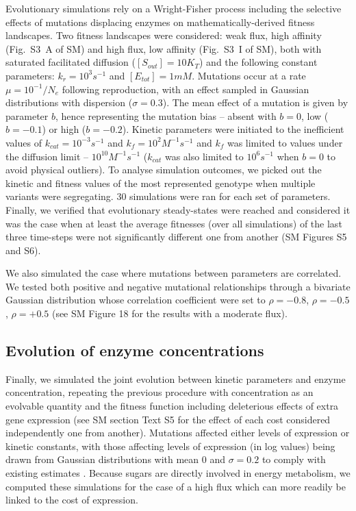 \documentclass[11pt,onecolumn]{article}
\begin{document}
Evolutionary simulations rely on a Wright-Fisher process including the selective effects of mutations displacing enzymes on mathematically-derived fitness landscapes. Two fitness landscapes were considered: weak flux, high affinity (Fig.~S3~A of SM) and high flux, low affinity (Fig.~S3~I of SM), both with saturated facilitated diffusion ($[S_{out}]=10K_T$) and the following constant parameters: $k_r=10^3s^{-1}$ and $[E_{tot}]=1mM$. Mutations occur at a rate $\mu=10^{-1}/N_e$ following reproduction, with an effect sampled in Gaussian distributions with dispersion ($\sigma=0.3$). The mean effect of a mutation is given by parameter $b$, hence representing the mutation bias -- absent with $b=0$, low ($b=-0.1$) or high ($b=-0.2$). Kinetic parameters were initiated to the inefficient values of $k_{cat}=10^{-3}s^{-1}$ and $k_f=10^2M^{-1}s^{-1}$ and $k_f$ was limited to values under the diffusion limit -- $10^{10}M^{-1}s^{-1}$ ($k_{cat}$ was also limited to $10^{6}s^{-1}$ when $b=0$ to avoid physical outliers). To analyse simulation outcomes, we picked out the kinetic and fitness values of the most represented genotype when multiple variants were segregating. 30 simulations were ran for each set of parameters. Finally, we verified that evolutionary steady-states were reached and considered it was the case when at least the average fitnesses (over all simulations) of the last three time-steps were not significantly different one from another (SM Figures S5 and S6).

We also simulated the case where mutations between parameters are correlated. We tested both positive and negative mutational relationships through a bivariate Gaussian distribution whose correlation coefficient were set to $\rho=-0.8$, $\rho=-0.5$, $\rho=+0.5$ (see SM Figure 18 for the results with a moderate flux). 

\subsection{Evolution of enzyme concentrations}

Finally, we simulated the joint evolution between kinetic parameters and enzyme concentration, repeating the previous procedure with concentration as an evolvable quantity and the fitness function including deleterious effects of extra gene expression (see SM section Text S5 for the effect of each cost considered independently one from another). Mutations affected either levels of expression or kinetic constants, with those affecting levels of expression (in log values) being drawn from Gaussian distributions with mean $0$ and $\sigma=0.2$ to comply with existing estimates \citep{Landry07,Metzger16,Hodgins-Davis19}. Because sugars are directly involved in energy metabolism, we computed these simulations for the case of a high flux which can more readily be linked to the cost of expression.
\end{document}
